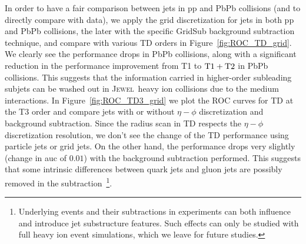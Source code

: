\documentclass[notoc,preprintnumbers]{JHEP3}
\newcommand{\jw}{\textsc{Jewel}~}
\begin{document}
In order to have a fair comparison between jets in pp and PbPb collisions (and to directly compare with data), we apply the grid discretization for jets in both pp and PbPb collisions, the later with the specific GridSub background subtraction technique, and compare with various TD orders in Figure~\ref{fig:ROC_TD_grid}. We clearly see the performance drops in PbPb collisions, along with a significant reduction in the performance improvement from T1 to $\rm T1+T2$ in PbPb collisions. This suggests that the information carried in higher-order subleading subjets can be washed out in \jw heavy ion collisions due to the medium interactions. In Figure~\ref{fig:ROC_TD3_grid} we plot the ROC curves for TD at the T3 order and compare jets with or without $\eta-\phi$ discretization and background subtraction. Since the radius scan in TD respects the $\eta-\phi$ discretization resolution, we don't see the change of the TD performance using particle jets or grid jets. On the other hand, the performance drops very slightly (change in auc of $0.01$) with the background subtraction performed. This suggests that some intrinsic differences between quark jets and gluon jets are possibly removed in the subtraction~\footnote{Underlying events and their subtractions in experiments can both influence and introduce jet substructure features. Such effects can only be studied with full heavy ion event simulations, which we leave for future studies.}.
\end{document}
